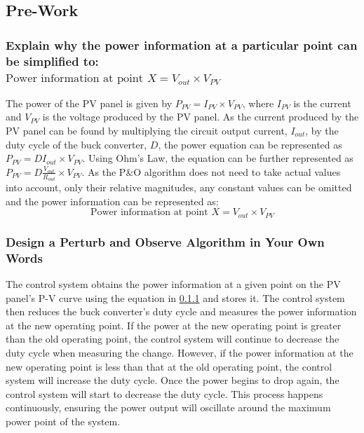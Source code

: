 \documentclass[]{article}
\begin{document}
		\subsection{Pre-Work}
			\subsubsection{Explain why the power information at a particular point can be simplified to:\\$\text{Power information at point } X = V_{out} \times V_{PV}$} \label{sssec:Powerinfo}
				The power of the PV panel is given by $P_{PV} = I_{PV} \times V_{PV}$, where $I_{PV}$ is the current and $V_{PV}$ is the voltage produced by the PV panel. As the current produced by the PV panel can be found by multiplying the circuit output current, $I_{out}$, by the duty cycle of the buck converter, $D$, the power equation can be represented as $P_{PV} = D I_{out} \times V_{PV}$. Using Ohm's Law, the equation can be further represented as $P_{PV} = D \frac{V_{out}}{R_{out}} \times V_{PV}$. As the P\&O algorithm does not need to take actual values into account, only their relative magnitudes, any constant values can be omitted and the power information can be represented as:
				\begin{equation*}
					\text{Power information at point } X = V_{out} \times V_{PV}
				\end{equation*}
 							
				
			\subsubsection{Design a Perturb and Observe Algorithm in Your Own Words}
			The control system obtains the power information at a given point on the PV panel's P-V curve using the equation in \cref{sssec:Powerinfo} and stores it. The control system then reduces the buck converter's duty cycle and measures the power information at the new operating point. If the power at the new operating point is greater than the old operating point, the control system will continue to decrease the duty cycle when measuring the change. However, if the power information at the new operating point is less than that at the old operating point, the control system will increase the duty cycle. Once the power begins to drop again, the control system will start to decrease the duty cycle. This process happens continuously, ensuring the power output will oscillate around the maximum power point of the system.\\
 					
\end{document}
